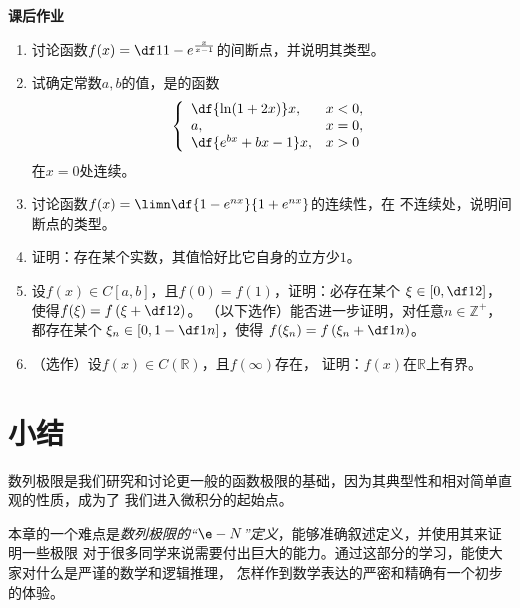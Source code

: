 \begin{ext}
	{\centering\bf 课后作业}
	
	\begin{enumerate}  
	  \item 讨论函数$f(x)=\df1{1-e^{\frac{x}{x-1}}}$的间断点，并说明其类型。
	  \item 试确定常数$a,b$的值，是的函数
	  $$
	  	\left\{\begin{array}{ll}
	  		\df{\ln(1+2x)}x,& x<0,\\
	  		a,& x=0,\\
	  		\df{e^{bx}+bx-1}x,& x>0
	  	\end{array}\right.
	  $$
	  在$x=0$处连续。
	  \item 讨论函数$f(x)=\limn\df{1-e^{nx}}{1+e^{nx}}$的连续性，在
	  不连续处，说明间断点的类型。
	  \item 证明：存在某个实数，其值恰好比它自身的立方少$1$。
	  \item 设$f(x)\in C[a,b]$，且$f(0)=f(1)$，证明：必存在某个
	  $\xi\in\left[0,\df12\right]$，使得$f(\xi)=f\left(\xi+\df12\right)$。
	  （以下选作）能否进一步证明，对任意$n\in\mathbb{Z}^+$，都存在某个
	  $\xi_n\in\left[0,1-\df1n\right]$，使得
	  $f(\xi_n)=f\left(\xi_n+\df1n\right)$。
	  \item （选作）设$f(x)\in C(\mathbb{R})$，且$f(\infty)$存在，
	  证明：$f(x)$在$\mathbb{R}$上有界。
	\end{enumerate}
\end{ext}

\section*{小结}

数列极限是我们研究和讨论更一般的函数极限的基础，因为其典型性和相对简单直观的性质，成为了
我们进入微积分的起始点。

本章的一个难点是{\it 数列极限的“$\e-N$”定义}，能够准确叙述定义，并使用其来证明一些极限
对于很多同学来说需要付出巨大的能力。通过这部分的学习，能使大家对什么是严谨的数学和逻辑推理，
怎样作到数学表达的严密和精确有一个初步的体验。

